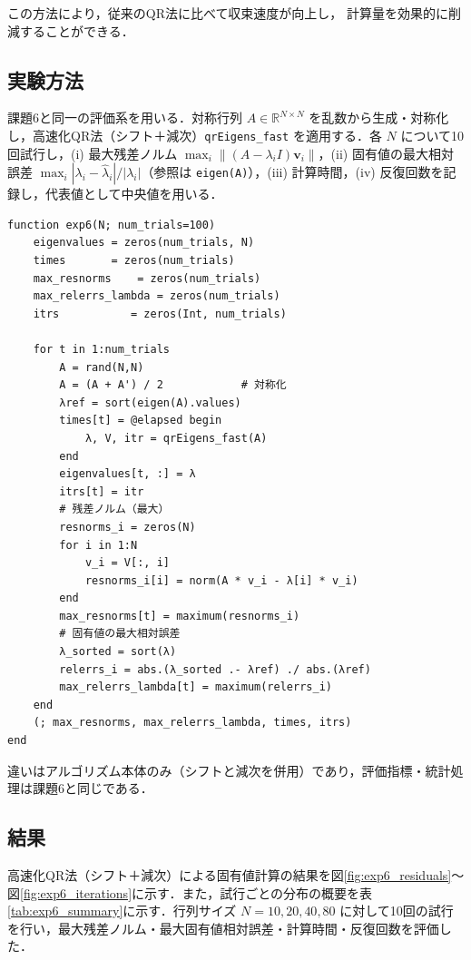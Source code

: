 \documentclass[a4paper,11pt]{ltjsarticle}
\begin{document}
この方法により，従来のQR法に比べて収束速度が向上し，
計算量を効果的に削減することができる．

\subsection{実験方法}
課題6と同一の評価系を用いる．対称行列 $A\in\mathbb{R}^{N\times N}$ を乱数から生成・対称化し，高速化QR法（シフト＋減次）\verb|qrEigens_fast| を適用する．各 $N$ について10回試行し，(i) 最大残差ノルム $\max_{i}\|(A-\lambda_{i} I)\boldsymbol{v}_{i}\|$，(ii) 固有値の最大相対誤差 $\max_{i} |\lambda_{i}-\hat{\lambda}_{i}|/|\lambda_{i}|$（参照は \verb|eigen(A)|），(iii) 計算時間，(iv) 反復回数を記録し，代表値として中央値を用いる．

\begin{verbatim}
function exp6(N; num_trials=100)
    eigenvalues = zeros(num_trials, N)
    times       = zeros(num_trials)
    max_resnorms    = zeros(num_trials)
    max_relerrs_lambda = zeros(num_trials)
    itrs           = zeros(Int, num_trials)

    for t in 1:num_trials
        A = rand(N,N)
        A = (A + A') / 2            # 対称化
        λref = sort(eigen(A).values)
        times[t] = @elapsed begin
            λ, V, itr = qrEigens_fast(A)
        end
        eigenvalues[t, :] = λ
        itrs[t] = itr
        # 残差ノルム（最大）
        resnorms_i = zeros(N)
        for i in 1:N
            v_i = V[:, i]
            resnorms_i[i] = norm(A * v_i - λ[i] * v_i)
        end
        max_resnorms[t] = maximum(resnorms_i)
        # 固有値の最大相対誤差
        λ_sorted = sort(λ)
        relerrs_i = abs.(λ_sorted .- λref) ./ abs.(λref)
        max_relerrs_lambda[t] = maximum(relerrs_i)
    end
    (; max_resnorms, max_relerrs_lambda, times, itrs)
end
\end{verbatim}

違いはアルゴリズム本体のみ（シフトと減次を併用）であり，評価指標・統計処理は課題6と同じである．


\subsection{結果}
高速化QR法（シフト＋減次）による固有値計算の結果を図\ref{fig:exp6_residuals}～図\ref{fig:exp6_iterations}に示す．また，試行ごとの分布の概要を表\ref{tab:exp6_summary}に示す．行列サイズ $N=10, 20, 40, 80$ に対して10回の試行を行い，最大残差ノルム・最大固有値相対誤差・計算時間・反復回数を評価した．
\end{document}

